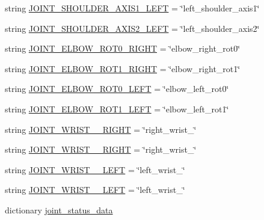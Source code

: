 \begin{DoxyCompactItemize}
\item 
string \mbox{\hyperlink{namespacesteering__test_a933a2a5afe6c68638f1a3774344fbbbc}{J\+O\+I\+N\+T\+\_\+\+S\+H\+O\+U\+L\+D\+E\+R\+\_\+\+A\+X\+I\+S1\+\_\+\+L\+E\+FT}} = \char`\"{}left\+\_\+shoulder\+\_\+axis1\char`\"{}
\item 
string \mbox{\hyperlink{namespacesteering__test_ac2f269c1954b27291963ed992c2e4872}{J\+O\+I\+N\+T\+\_\+\+S\+H\+O\+U\+L\+D\+E\+R\+\_\+\+A\+X\+I\+S2\+\_\+\+L\+E\+FT}} = \char`\"{}left\+\_\+shoulder\+\_\+axis2\char`\"{}
\item 
string \mbox{\hyperlink{namespacesteering__test_a90fa9d781d5cb7fe227f643415edb040}{J\+O\+I\+N\+T\+\_\+\+E\+L\+B\+O\+W\+\_\+\+R\+O\+T0\+\_\+\+R\+I\+G\+HT}} = \char`\"{}elbow\+\_\+right\+\_\+rot0\char`\"{}
\item 
string \mbox{\hyperlink{namespacesteering__test_a1d83ba6adbc3cee592361c4ef2539b07}{J\+O\+I\+N\+T\+\_\+\+E\+L\+B\+O\+W\+\_\+\+R\+O\+T1\+\_\+\+R\+I\+G\+HT}} = \char`\"{}elbow\+\_\+right\+\_\+rot1\char`\"{}
\item 
string \mbox{\hyperlink{namespacesteering__test_a661810f9c14b361bd51b7690709fd36d}{J\+O\+I\+N\+T\+\_\+\+E\+L\+B\+O\+W\+\_\+\+R\+O\+T0\+\_\+\+L\+E\+FT}} = \char`\"{}elbow\+\_\+left\+\_\+rot0\char`\"{}
\item 
string \mbox{\hyperlink{namespacesteering__test_a1f5aabc744c1dff4f725d9e3de56883e}{J\+O\+I\+N\+T\+\_\+\+E\+L\+B\+O\+W\+\_\+\+R\+O\+T1\+\_\+\+L\+E\+FT}} = \char`\"{}elbow\+\_\+left\+\_\+rot1\char`\"{}
\item 
string \mbox{\hyperlink{namespacesteering__test_a6c73275c63715e7026deeb172bba455e}{J\+O\+I\+N\+T\+\_\+\+W\+R\+I\+S\+T\+\_\+\_\+\+R\+I\+G\+HT}} = \char`\"{}right\+\_\+wrist\+\_\char`\"{}
\item 
string \mbox{\hyperlink{namespacesteering__test_af945707722fc5514f95b518d77fccb23}{J\+O\+I\+N\+T\+\_\+\+W\+R\+I\+S\+T\+\_\+\_\+\+R\+I\+G\+HT}} = \char`\"{}right\+\_\+wrist\+\_\char`\"{}
\item 
string \mbox{\hyperlink{namespacesteering__test_a3cf9e8ce013cebdab34ec22214f196bf}{J\+O\+I\+N\+T\+\_\+\+W\+R\+I\+S\+T\+\_\+\_\+\+L\+E\+FT}} = \char`\"{}left\+\_\+wrist\+\_\char`\"{}
\item 
string \mbox{\hyperlink{namespacesteering__test_a2c1299366869834901e98d5cb1714d7a}{J\+O\+I\+N\+T\+\_\+\+W\+R\+I\+S\+T\+\_\+\_\+\+L\+E\+FT}} = \char`\"{}left\+\_\+wrist\+\_\char`\"{}
\item 
dictionary \mbox{\hyperlink{namespacesteering__test_a90ffbf4f7b99844660090b39c9badad5}{joint\+\_\+status\+\_\+data}}

\end{DoxyCompactItemize}
